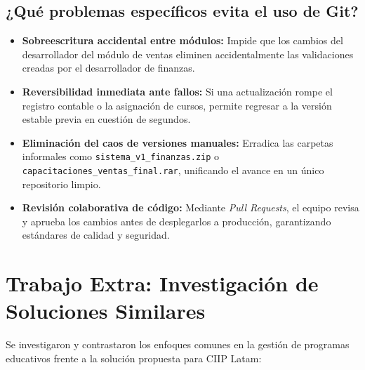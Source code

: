 \documentclass[11pt,a4paper]{article}
\begin{document}
\subsection{¿Qué problemas específicos evita el uso de Git?}
\begin{itemize}
    \item \textbf{Sobreescritura accidental entre módulos:} Impide que los cambios del desarrollador del módulo de ventas eliminen accidentalmente las validaciones creadas por el desarrollador de finanzas.
    \item \textbf{Reversibilidad inmediata ante fallos:} Si una actualización rompe el registro contable o la asignación de cursos, permite regresar a la versión estable previa en cuestión de segundos.
    \item \textbf{Eliminación del caos de versiones manuales:} Erradica las carpetas informales como \texttt{sistema\_v1\_finanzas.zip} o \texttt{capacitaciones\_ventas\_final.rar}, unificando el avance en un único repositorio limpio.
    \item \textbf{Revisión colaborativa de código:} Mediante \textit{Pull Requests}, el equipo revisa y aprueba los cambios antes de desplegarlos a producción, garantizando estándares de calidad y seguridad.
\end{itemize}

\section{Trabajo Extra: Investigación de Soluciones Similares}
Se investigaron y contrastaron los enfoques comunes en la gestión de programas educativos frente a la solución propuesta para CIIP Latam:
\end{document}
